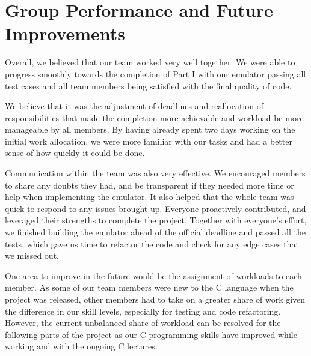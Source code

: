 \documentclass{article}
\begin{document}
    \section{Group Performance and Future Improvements}
    Overall, we believed that our team worked very well together. We were able to progress smoothly towards the completion of Part I with our emulator passing all test cases and all team members being satisfied with the final quality of code.
    
    We believe that it was the adjustment of deadlines and reallocation of responsibilities %
    that made the completion more achievable and workload be more manageable by all members. %
    By having already spent two days working on the initial work allocation, we were more familiar with our tasks %
    and had a better sense of how quickly it could be %
    done.
    
    Communication within the team was also very effective. We encouraged members to share any doubts they had, and be transparent if they needed more time %
    or help when implementing the emulator. It also helped that the whole team was quick to respond to any issues brought up.
    Everyone proactively contributed, and leveraged their strengths to complete the project. Together with everyone's effort, we finished building the emulator ahead of the official deadline and passed all the tests, which gave us time to refactor the code and check for any edge cases that we missed out.
    
    One area to improve in the future would be the assignment of workloads to each member. As some of our team members were new to the C language when the project was released, other members had to take on a greater share of work given the difference in our skill levels, especially for testing and code refactoring. However, the current unbalanced share of workload can be resolved for the following parts of the project as our C programming skills have improved while working and with the ongoing C lectures. 
\end{document}
